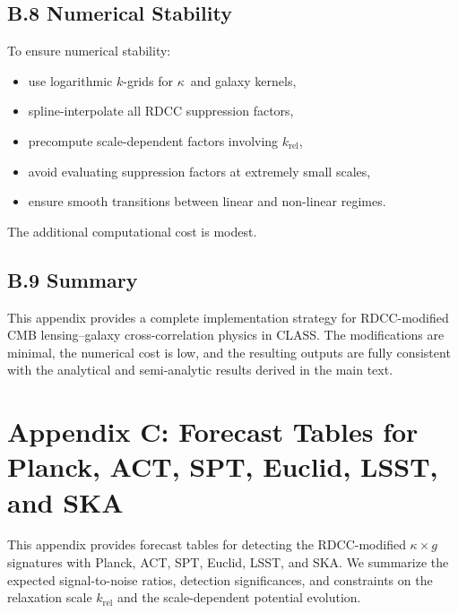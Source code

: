 \documentclass[11pt,a4paper]{article}
\newcommand{\kapp}{\texorpdfstring{$\kappa$}{κ}}
\begin{document}
\subsection*{B.8 Numerical Stability}

To ensure numerical stability:

\begin{itemize}
    \item use logarithmic $k$-grids for \kapp\ and galaxy kernels,
    \item spline-interpolate all RDCC suppression factors,
    \item precompute scale-dependent factors involving $k_{\mathrm{rel}}$,
    \item avoid evaluating suppression factors at extremely small scales,
    \item ensure smooth transitions between linear and non-linear regimes.
\end{itemize}

The additional computational cost is modest.

\subsection*{B.9 Summary}

This appendix provides a complete implementation strategy for RDCC-modified 
CMB lensing–galaxy cross-correlation physics in CLASS. The modifications are minimal, the 
numerical cost is low, and the resulting outputs are fully consistent with the analytical 
and semi-analytic results derived in the main text.

\section*{Appendix C: Forecast Tables for Planck, ACT, SPT, Euclid, LSST, and SKA}

This appendix provides forecast tables for detecting the RDCC-modified $\kappa \times g$ 
signatures with Planck, ACT, SPT, Euclid, LSST, and SKA. We summarize the expected 
signal-to-noise ratios, detection significances, and constraints on the relaxation scale 
$k_{\mathrm{rel}}$ and the scale-dependent potential evolution.
\end{document}
